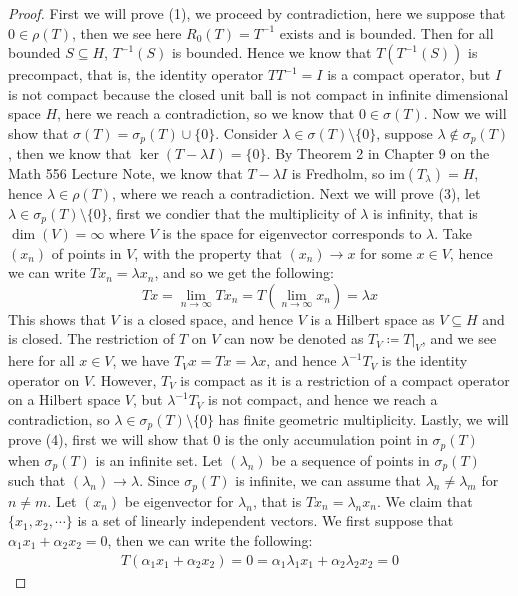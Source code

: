 \documentclass[11pt]{book}
\theoremstyle{break}
\theoremstyle{break}
\newcommand{\im}{\text{im}}
\begin{document}
\begin{proof}
First we will prove (1), we proceed by contradiction, here we suppose that $0 \in \rho(T)$, then we see here $R_0(T) = T^{-1}$ exists and is bounded. Then for all bounded $S \subseteq  H$, $T^{-1}(S)$ is bounded. Hence we know that $T(T^{-1}(S))$ is precompact, that is, the identity operator $TT^{-1} = I$ is a compact operator, but $I$ is not compact because the closed unit ball is not compact in infinite dimensional space $H$, here we reach a contradiction, so we know that $0 \in \sigma(T)$. Now we will show that $\sigma(T) = \sigma_p(T) \cup \{0\}$. Consider $\lambda \in \sigma(T)\setminus \{0\}$, suppose $\lambda \notin \sigma_p(T)$, then we know that $\ker(T - \lambda I) = \{0\}$. By Theorem 2 in Chapter 9 on the Math 556 Lecture Note, we know that $T - \lambda I$ is Fredholm, so $\im(T_{\lambda}) = H$, hence $\lambda \in \rho(T)$, where we reach a contradiction. Next we will prove (3), let $\lambda \in \sigma_p(T) \setminus \{0\}$, first we condier that the multiplicity of $\lambda$ is infinity, that is $\dim(V) = \infty$ where $V$ is the space for eigenvector corresponds to $\lambda$. Take $(x_n)$ of points in $V$, with the property that $(x_n) \to x$ for some $x \in V$, hence we can write $Tx_n = \lambda x_n$, and so we get the following: $$Tx=\lim_{n\to \infty}Tx_n =T\left(\lim_{n\to \infty}x_n\right) =\lambda x$$
This shows that $V$ is a closed space, and hence $V$ is a Hilbert space as $V \subseteq H$ and is closed. The restriction of $T$ on $V$ can now be denoted as $T_V\coloneqq T|_V$, and we see here for all $x \in V$, we have $T_Vx = Tx = \lambda x$, and hence $\lambda^{-1}T_V$ is the identity operator on $V$. However, $T_V$ is compact as it is a restriction of a compact operator on a Hilbert space $V$, but $\lambda^{-1}T_V$ is not compact, and hence we reach a contradiction, so $\lambda \in \sigma_p(T) \setminus \{0\}$ has finite geometric multiplicity. Lastly, we will prove (4), first we will show that $0$ is the only accumulation point in $\sigma_p(T)$ when $\sigma_p(T)$ is an infinite set. Let $(\lambda_n)$ be a sequence of points in $\sigma_p(T)$ such that $(\lambda_n) \to \lambda$. Since $\sigma_p(T)$ is infinite, we can assume that $\lambda_n \neq \lambda_m$ for $n \neq m$. Let $(x_n)$ be eigenvector for $\lambda_n$, that is $Tx_n = \lambda_n x_n$. We claim that $\{x_1, x_2,\cdots\}$ is a set of linearly independent vectors. We first suppose that $\alpha_1 x_1 + \alpha_2 x_2 = 0$, then we can write the following:
\begin{align*}
T(\alpha_1 x_1 + \alpha_2 x_2 )= 0 = \alpha_1 \lambda_1 x_1 + \alpha_2 \lambda_2 x_2 =0

\end{align*}
\end{proof}
\end{document}
